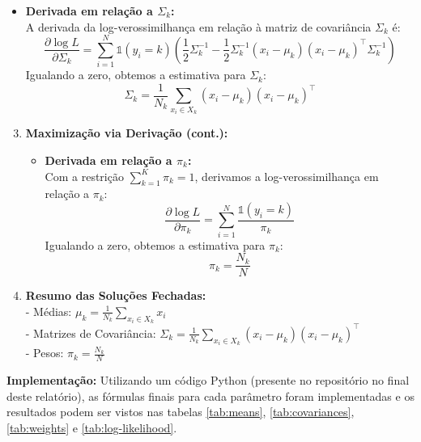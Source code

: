 \begin{enumerate}
\begin{tcolorbox}[colback=white, colframe=black, title=Resposta:]
\begin{enumerate}
\begin{itemize}
            \item \textbf{Derivada em relação a \( \Sigma_k \):} \\
            A derivada da log-verossimilhança em relação à matriz de covariância \( \Sigma_k \) é:
            \[
            \frac{\partial \log L}{\partial \Sigma_k} = \sum_{i=1}^{N} \mathbb{1}(y_i = k) \left( \frac{1}{2} \Sigma_k^{-1} - \frac{1}{2} \Sigma_k^{-1}(x_i - \mu_k)(x_i - \mu_k)^\top \Sigma_k^{-1} \right)
            \]
            Igualando a zero, obtemos a estimativa para \( \Sigma_k \):
            \[
            \Sigma_k = \frac{1}{N_k} \sum_{x_i \in X_k} (x_i - \mu_k)(x_i - \mu_k)^\top
            \]
        \end{itemize}
    \end{enumerate}
\end{tcolorbox}

\begin{tcolorbox}[colback=white, colframe=black, title=Resposta (continuação):]
    
    \begin{enumerate}
        \setcounter{enumii}{2}
        \item \textbf{Maximização via Derivação (cont.):}
        
        \begin{itemize}
            \item \textbf{Derivada em relação a \( \pi_k \):} \\
            Com a restrição \( \sum_{k=1}^{K} \pi_k = 1 \), derivamos a log-verossimilhança em relação a \( \pi_k \):
            \[
            \frac{\partial \log L}{\partial \pi_k} = \sum_{i=1}^{N} \frac{\mathbb{1}(y_i = k)}{\pi_k}
            \]
            Igualando a zero, obtemos a estimativa para \( \pi_k \):
            \[
            \pi_k = \frac{N_k}{N}
            \]
        \end{itemize}

        \item \textbf{Resumo das Soluções Fechadas:} \\
        - Médias: \( \mu_k = \frac{1}{N_k} \sum_{x_i \in X_k} x_i \) \\
        - Matrizes de Covariância: \( \Sigma_k = \frac{1}{N_k} \sum_{x_i \in X_k} (x_i - \mu_k)(x_i - \mu_k)^\top \) \\
        - Pesos: \( \pi_k = \frac{N_k}{N} \)
    
    \end{enumerate}
    

\textbf{Implementação:}
Utilizando um código Python (presente no repositório no final deste relatório), as fórmulas finais para cada parâmetro foram implementadas e os resultados podem ser vistos nas tabelas \ref{tab:means}, \ref{tab:covariances}, \ref{tab:weights} e \ref{tab:log-likelihood}.


\end{tcolorbox}
\end{enumerate}
